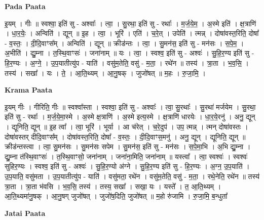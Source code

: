 \documentclass[17pt]{extarticle}
\begin{document}
\textbf{Pada Paata} \newline

इ॒यम् । गीः ॥ स्वश्वा॒ इति॑ सु - अश्वाः᳚ । त्वा॒ । सु॒रथा॒ इति॑ सु - रथाः᳚ । म॒र्ज॒ये॒म॒ । अ॒स्मे इति॑ । क्ष॒त्राणि॑ । धा॒र॒येः॒ । अन्विति॑ । द्यून् ॥ इ॒ह । त्वा॒ । भूरि॑ । एति॑ । च॒रे॒त् । उपेति॑ । त्‍मन्न् । दोषा॑वस्त॒रिति॒ दोषा᳚ - व॒स्तः॒ । दी॒दि॒वाꣳस᳚म् । अन्विति॑ । द्यून् ॥ क्रीड॑न्तः । त्वा॒ । सु॒मन॑स॒ इति॑ सु - मन॑सः । स॒पे॒म॒ । अ॒भीति॑ । द्यु॒म्ना । त॒स्थि॒वाꣳसः॑ । जना॑नाम् ॥ यः । त्वा॒ । स्वश्व॒ इति॑ सु - अश्वः॑ । सु॒हि॒र॒ण्य इति॑ सु - हि॒र॒ण्यः । अ॒ग्ने॒ । उ॒प॒यातीत्यु॑प - याति॑ । वसु॑म॒तेति॒ वसु॑ - म॒ता॒ । रथे॑न ॥ तस्य॑ । त्रा॒ता । भ॒व॒सि॒ । तस्य॑ । सखा᳚ । यः । ते॒ । आ॒ति॒थ्यम् । आ॒नु॒षक् । जुजो॑षत् ॥ म॒हः । रु॒जा॒मि॒ ।  \newline


\textbf{Krama Paata} \newline

इ॒यम् गीः । गीरिति॒ गीः ॥ स्वश्वा᳚स्ता । स्वश्वा॒ इति॑ सु - अश्वाः᳚ । त्वा॒ सु॒रथाः᳚ । सु॒रथा॑ मर्जयेम । सु॒रथा॒ इति॑ सु - रथाः᳚ । म॒र्ज॒ये॒मा॒स्मे । अ॒स्मे क्ष॒त्राणि॑ । अ॒स्मे इत्य॒स्मे । क्ष॒त्राणि॑ धारयेः । धा॒र॒ये॒रनु॑ । अनु॒ द्यून् । द्यूनिति॒ द्यून् ॥ इ॒ह त्वा᳚ । त्वा॒ भूरि॑ । भूर्या । आ च॑रेत् । च॒रे॒दुप॑ । उप॒ त्मन्न् । त्मन् दोषा॑वस्तः । दोषा॑वस्तर् दीदि॒वाꣳस᳚म् । दोषा॑वस्त॒रिति॒ दोषा᳚ - व॒स्तः॒ । दी॒दि॒वाꣳस॒मनु॑ । अनु॒ द्यून् । द्यूनिति॒ द्यून् ॥ क्रीड॑न्तस्त्वा । त्वा॒ सु॒मन॑सः । सु॒मन॑सः सपेम । सु॒मन॑स॒ इति॑ सु - मन॑सः । स॒पे॒मा॒भि । अ॒भि द्यु॒म्ना । द्यु॒म्ना त॑स्थि॒वाꣳसः॑ । त॒स्थि॒वाꣳसो॒ जना॑नाम् । जना॑ना॒मिति॒ जना॑नाम् ॥ यस्त्वा᳚ । त्वा॒ स्वश्वः॑ । स्वश्वः॑ सुहिर॒ण्यः । स्वश्व॒ इति॑ सु - अश्वः॑ । सु॒हि॒र॒ण्यो अ॑ग्ने । सु॒हि॒र॒ण्य इति॑ सु - हि॒र॒ण्यः । अ॒ग्न॒ उ॒प॒याति॑ । उ॒प॒याति॒ वसु॑मता । उ॒प॒यातीत्यु॑प - याति॑ । वसु॑मता॒ रथे॑न । वसु॑म॒तेति॒ वसु॑ - म॒ता॒ । रथे॒नेति॒ रथे॑न ॥ तस्य॑ त्रा॒ता । त्रा॒ता भ॑वसि । भ॒व॒सि॒ तस्य॑ । तस्य॒ सखा᳚ । सखा॒ यः । यस्ते᳚ । त॒ आ॒ति॒थ्यम् । आ॒ति॒थ्यमा॑नु॒षक् । आ॒नु॒षग् जुजो॑षत् । जुजो॑ष॒दिति॒ जुजो॑षत् ॥ म॒हो रु॑जामि । रु॒जा॒मि॒ ब॒न्धुता᳚ \newline

\textbf{Jatai Paata} \newline
\end{document}
